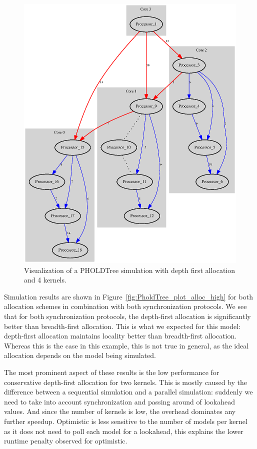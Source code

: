 \begin{figure}
    \center
    \includegraphics[width=\columnwidth]{fig/pholdtreed1n3t5000c4DFS.eps}
    \caption{Visualization of a PHOLDTree simulation with depth first allocation and 4 kernels.}
    \label{fig:pholdtree_visualize_parDFS}
\end{figure}

Simulation results are shown in Figure~\ref{fig:PholdTree_plot_alloc_high} for both allocation schemes in combination with both synchronization protocols.
We see that for both synchronization protocols, the depth-first allocation is significantly better than breadth-first allocation.
This is what we expected for this model: depth-first allocation maintains locality better than breadth-first allocation.
Whereas this is the case in this example, this is not true in general, as the ideal allocation depends on the model being simulated.

The most prominent aspect of these results is the low performance for conservative depth-first allocation for two kernels.
This is mostly caused by the difference between a sequential simulation and a parallel simulation: suddenly we need to take into account synchronization and passing around of lookahead values.
And since the number of kernels is low, the overhead dominates any further speedup.
Optimistic is less sensitive to the number of models per kernel as it does not need to poll each model for a lookahead, this explains the lower runtime penalty observed for optimistic.

